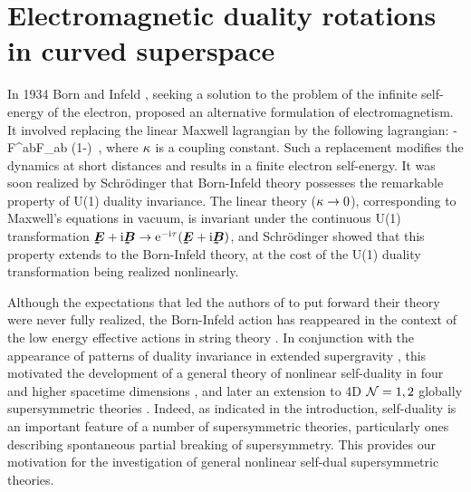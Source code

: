 \chapter{Electromagnetic duality rotations in curved superspace} 
\label{chap:em_duality}


In 1934 Born and Infeld \cite{Born:1934gh}, seeking a solution to the problem of the infinite self-energy of the electron, proposed an alternative formulation of electromagnetism. It involved replacing the linear Maxwell lagrangian by the following lagrangian:
\be
- %
F^{ab}F_{ab}\quad\longrightarrow\quad
{} %
\left(1-\right)~,
\ee
where $\kappa$ is a coupling constant. Such a replacement modifies the dynamics at short distances and results in a finite electron self-energy. It was soon realized by Schr{\"o}dinger \cite{Schrodinger:1935} that Born-Infeld theory possesses the remarkable property of U(1) duality invariance. The linear theory ($\kappa\to0$), corresponding to Maxwell's equations in vacuum, is invariant under the continuous U(1) transformation $\vec{E}+{\rm i}\vec{B}\to{\rm e}^{-{\rm i}\t}(\vec{E}+{\rm i}\vec{B})$, and Schr{\"o}dinger showed that this property extends to the Born-Infeld theory, at the cost of the U(1) duality transformation being realized nonlinearly.

Although the expectations that led the authors of \cite{Born:1934gh} to put forward their theory were never fully realized, the Born-Infeld action has reappeared in the context of the low energy effective actions in string theory \cite{Fradkin:1985qd,Leigh:1989jq}. In conjunction with the appearance of patterns of duality invariance in extended supergravity \cite{Ferrara:1976iq,Cremmer:1979up}, this motivated the development of a general theory of nonlinear self-duality in four and higher spacetime dimensions \cite{Gaillard:1981rj,Zumino:1981pt,Gibbons:1995cv,Gibbons:1995ap,Gaillard:1997zr,Gaillard:1997rt,Tanii:1998px,Araki:1998nn,Kimura:1999jb,Brace:1999zi,Hatsuda:1999ys,Aschieri:1999jr,Aschieri:2000dx,Ivanov:2002ab,Ivanov:2003uj}, and later an extension to 4D ${\cal N}=1,2$ globally supersymmetric theories \cite{Kuzenko:2000tg,Kuzenko:2000uh}. Indeed, as indicated in the introduction, self-duality is an important feature of a number of supersymmetric theories, particularly ones describing spontaneous partial breaking of supersymmetry. This provides our motivation for the investigation of general nonlinear self-dual supersymmetric theories.

